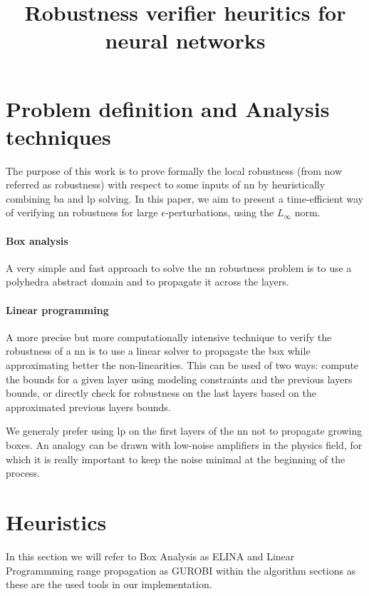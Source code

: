 \documentclass[8pt,a4paper]{article}
\title{
	Robustness verifier heuritics for neural networks
}
\begin{document}
\maketitle

\section{Problem definition and Analysis techniques}

The purpose of this work is to prove formally the local robustness (from now referred as robustness) with respect to some inputs of \gls{nn} by heuristically combining \gls{ba} and \gls{lp} solving. 
In this paper, we aim to present a time-efficient way of verifying \gls{nn} robustness for large $\epsilon$-perturbations, using the $L_\infty$ norm.

\paragraph*{Box analysis}

A very simple and fast approach to solve the \gls{nn} robustness problem is to use a polyhedra abstract domain and to propagate it across the layers.

\paragraph*{Linear programming}

A more precise but more computationally intensive technique to verify the robustness of a \gls{nn} is to use a linear solver to propagate the box while approximating better the non-linearities. This can be used of two ways: compute the bounds for a given layer using modeling constraints and the previous layers bounds, or directly check for robustness on the last layers based on the approximated previous layers bounds.

We generaly prefer using \gls{lp} on the first layers of the \gls{nn} not to propagate growing boxes. An analogy can be drawn with low-noise amplifiers in the physics field, for which it is really important to keep the noise minimal at the beginning of the process.

\section{Heuristics}

In this section we will refer to Box Analysis as ELINA and Linear Programmming range propagation as GUROBI within the algorithm sections as these are the used tools in our implementation.
\end{document}
